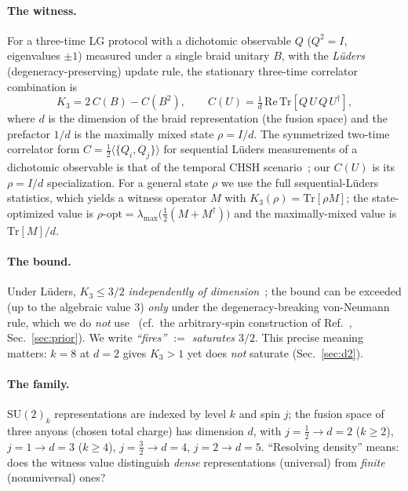 \documentclass[aps,prx,reprint,amsmath,amssymb,floatfix,nofootinbib,superscriptaddress]{revtex4-2}
\begin{document}
\paragraph{The witness.}
For a three-time LG protocol with a dichotomic observable $Q$ ($Q^2 = I$,
eigenvalues $\pm 1$) measured under a single braid unitary $B$, with the \emph{L\"uders}
(degeneracy-preserving) update rule, the stationary three-time correlator combination is
\begin{equation}
  K_3 = 2\,C(B) - C(B^2),
  \qquad
  C(U) = \tfrac1d\,\mathrm{Re}\,\mathrm{Tr}\!\left[Q\,U\,Q\,U^{\dagger}\right],
\label{eq:K3}
\end{equation}
where $d$ is the dimension of the braid representation (the fusion space) and the
prefactor $1/d$ is the maximally mixed state $\rho = I/d$. The symmetrized
two-time correlator form $C = \tfrac12 \langle \{Q_i, Q_j\} \rangle$ for sequential
L\"uders measurements of a dichotomic observable is that of the temporal CHSH
scenario~\cite{Fri}; our $C(U)$ is its $\rho = I/d$ specialization. For a
general state $\rho$ we use the full sequential-L\"uders statistics, which yields a
witness operator $M$ with $K_3(\rho) = \mathrm{Tr}[\rho M]$; the state-optimized value
is $\rho\text{-opt} = \lambda_{\max}\!\big(\tfrac12 (M + M^{\dagger})\big)$ and the
maximally-mixed value is $\mathrm{Tr}[M]/d$.

\paragraph{The bound.}
Under L\"uders, $K_3 \le 3/2$ \emph{independently of dimension}~\cite{BMKG,BE}; the
bound can be exceeded (up to the algebraic value $3$) \emph{only} under the
degeneracy-breaking von-Neumann rule, which we do \emph{not} use~\cite{BE} (cf.\ the
arbitrary-spin construction of Ref.~\cite{MM}, Sec.~\ref{sec:prior}). We write
\emph{``fires'' $:=$ saturates $3/2$}. This precise meaning matters: $k=8$ at $d=2$
gives $K_3 > 1$ yet does \emph{not} saturate (Sec.~\ref{sec:d2}).

\paragraph{The family.}
$\mathrm{SU}(2)_k$ representations are indexed by level $k$ and spin $j$; the fusion
space of three anyons (chosen total charge) has dimension $d$, with
$j = \tfrac12 \to d = 2$ ($k \ge 2$), $j = 1 \to d = 3$ ($k \ge 4$),
$j = \tfrac32 \to d = 4$, $j = 2 \to d = 5$. ``Resolving density'' means: does the
witness value distinguish \emph{dense} representations (universal) from \emph{finite}
(nonuniversal) ones?
\end{document}

